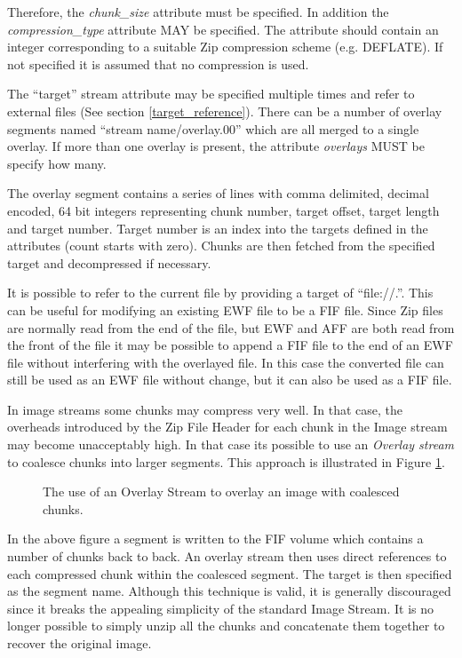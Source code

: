 \documentclass[10pt, conference]{IEEEtran}
\begin{document}
Therefore, the {\em chunk\_size} attribute must be specified. In
addition the {\em compression\_type} attribute MAY be specified. The
attribute should contain an integer corresponding to a suitable Zip
compression scheme (e.g. DEFLATE). If not specified it is assumed
that no compression is used.

The ``target'' stream attribute may be specified multiple times and
refer to external files (See section \ref{target_reference}). There
can be a number of overlay segments named ``stream name/overlay.00''
which are all merged to a single overlay. If more than one overlay is
present, the attribute {\em overlays} MUST be specify how many.

The overlay segment contains a series of lines with comma delimited,
decimal encoded, 64 bit integers representing chunk number, target
offset, target length and target number. Target number is an index
into the targets defined in the attributes (count starts with zero).
Chunks are then fetched from the specified target and decompressed if
necessary.

It is possible to refer to the current file by providing a target of
``file://.''. This can be useful for modifying an existing EWF file to
be a FIF file. Since Zip files are normally read from the end of the
file, but EWF and AFF are both read from the front of the file it may
be possible to append a FIF file to the end of an EWF file without
interfering with the overlayed file. In this case the converted file
can still be used as an EWF file without change, but it can also be
used as a FIF file.

In image streams some chunks may compress very well. In that case, the
overheads introduced by the Zip File Header for each chunk in the
Image stream may become unacceptably high. In that case its possible
to use an {\em Overlay stream} to coalesce chunks into larger
segments. This approach is illustrated in Figure \ref{overlay}.

\begin{figure}[tb]
  \begin{center}
  \mbox{\columnwidth {}}
  \caption{The use of an Overlay Stream to overlay an image with
coalesced chunks.}
  \label{overlay}
  \end{center}
\end{figure}

In the above figure a segment is written to the FIF volume which
contains a number of chunks back to back. An overlay stream then uses
direct references to each compressed chunk within the coalesced
segment. The target is then specified as the segment name. Although
this technique is valid, it is generally discouraged since it breaks
the appealing simplicity of the standard Image Stream.  It is no
longer possible to simply unzip all the chunks and concatenate them
together to recover the original image.
\end{document}
